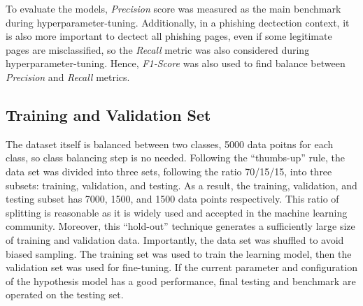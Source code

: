 To evaluate the models, \emph{Precision} score was measured as the main benchmark during hyperparameter-tuning.
Additionally, in a phishing dectection context, it is also more important to dectect all
phishing pages, even if some legitimate pages are misclassified, so the \emph{Recall} metric was also
considered during hyperparameter-tuning. Hence, \emph{F1-Score } was also used to find balance
between \emph{Precision} and \emph{Recall} metrics.

\subsection{Training and Validation Set}
The dataset itself is balanced between two classes, 5000 data poitns for each class, so class balancing step
is no needed. Following the ``thumbs-up'' rule, the data set was divided into three sets, following the ratio 70/15/15,
into three subsets: training, validation, and testing. As a result, the training, validation, and testing subset
has 7000, 1500, and 1500 data points respectively. This ratio of splitting is reasonable as it is widely used and accepted
in the machine learning community. Moreover, this ``hold-out'' technique generates a sufficiently large size of
training and validation data. Importantly, the data set was shuffled to avoid biased sampling. The training
set was used to train the learning model, then the validation set was used for fine-tuning. If the current parameter
and configuration of the hypothesis model has a good performance, final testing and benchmark are operated on the
testing set.
